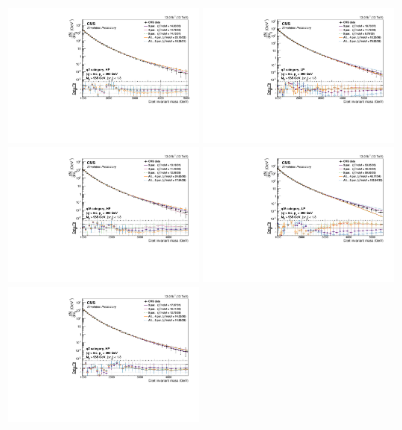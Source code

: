 \begin{figure}[htb]
\centering
\includegraphics[width=0.45\textwidth]{figures/analysis/search2/AN-16-235/plots/qVHP_fitComp.pdf}
\includegraphics[width=0.45\textwidth]{figures/analysis/search2/AN-16-235/plots/qVLP_fitComp.pdf}\\
\includegraphics[width=0.45\textwidth]{figures/analysis/search2/AN-16-235/plots/qWHP_fitComp.pdf}
\includegraphics[width=0.45\textwidth]{figures/analysis/search2/AN-16-235/plots/qWLP_fitComp.pdf}\\
\includegraphics[width=0.45\textwidth]{figures/analysis/search2/AN-16-235/plots/qZHP_fitComp.pdf}

\end{figure}

